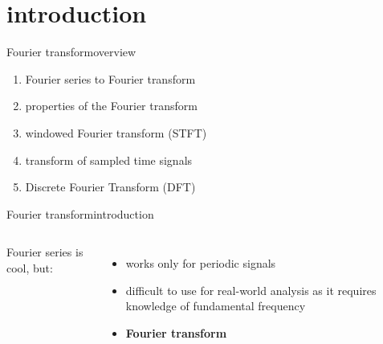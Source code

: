 


\subtitle{Part 8: Fourier Transform}


	

\section[intro]{introduction}
        \begin{frame}{Fourier transform}{overview}
            \begin{enumerate}
                \item   Fourier series to Fourier transform
                \item   properties of the Fourier transform
                \item   windowed Fourier transform (STFT)
                \item   transform of sampled time signals
                \item   Discrete Fourier Transform (DFT)
            \end{enumerate}
        \end{frame}

	\begin{frame}{Fourier transform}{introduction}
        \begin{columns}
		Fourier series is cool, but:
		\begin{itemize}
			\item	works only for periodic signals 
			\item	difficult to use for real-world analysis as it requires knowledge of fundamental frequency
			\item<2->[$\Rightarrow$]	\textbf{Fourier transform}
		\end{itemize}
        \end{columns}
	\end{frame}	

